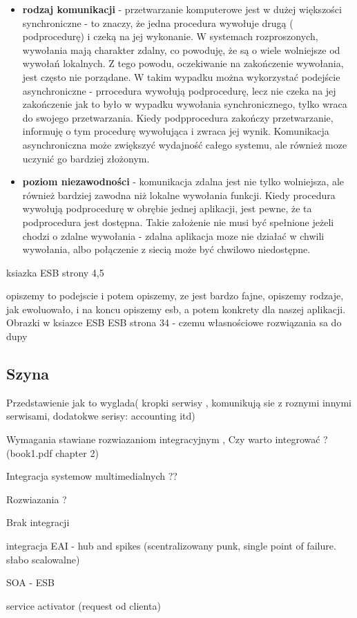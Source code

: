 \begin{itemize}
	\item \textbf{rodzaj komunikacji} - przetwarzanie komputerowe jest w dużej większości synchroniczne - to znaczy, że jedna procedura wywołuje drugą ( podprocedurę) i czeką na jej wykonanie. W systemach rozproszonych, wywołania mają charakter zdalny, co powoduję, że są o wiele wolniejsze od wywołań lokalnych. Z tego powodu, oczekiwanie na zakończenie wywołania, jest często nie porządane. W takim wypadku można wykorzystać podejście asynchroniczne - prrocedura wywołują podprocedurę, lecz nie czeka na jej zakończenie jak to było w wypadku wywołania synchronicznego, tylko wraca do swojego przetwarzania. Kiedy podpprocedura zakończy przetwarzanie, informuję o tym procedurę wywołująca i zwraca jej wynik. Komunikacja asynchroniczna może zwiększyć wydajność całego systemu, ale również moze uczynić go bardziej złożonym.
	\item \textbf{poziom niezawodności} - komunikacja zdalna jest nie tylko wolniejsza, ale również bardziej zawodna niż lokalne wywołania funkcji. Kiedy procedura wywołują podprocedurę w obrębie jednej aplikacji, jest pewne, że ta podprocedura jest dostępna. Takie założenie nie musi być spełnione jeżeli chodzi o zdalne wywołania - zdalna aplikacja moze nie działać w chwili wywołania, albo połączenie z siecią może być chwilowo niedostępne.
\end{itemize}



ksiazka ESB strony 4,5 

opiszemy to podejscie i potem opiszemy, ze jest bardzo fajne, opiszemy rodzaje, jak ewoluowało, i na koncu opiszemy esb, a potem konkrety dla naszej aplikacji. Obrazki w ksiazce ESB
ESB strona 34 - czemu własnościowe rozwiązania sa do dupy 



\subsection {Szyna} 

Przedstawienie jak to wyglada( kropki serwisy , komunikują sie z roznymi innymi serwisami, dodatokwe serisy: accounting itd)

Wymagania stawiane rozwiazaniom integracyjnym , Czy warto integrować ? (book1.pdf chapter 2)

Integracja systemow multimedialnych ??

Rozwiazania ?

Brak integracji

integracja EAI - hub and spikes (scentralizowany punk, single point of failure. słabo scalowalne)

SOA - ESB 




service activator (request od clienta)



